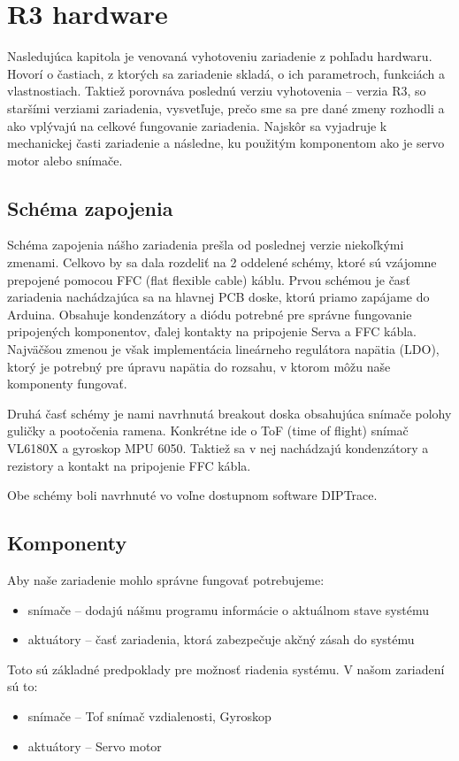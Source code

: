 \chapter{R3 hardware}
\label{kap:2}
Nasledujúca kapitola je venovaná vyhotoveniu zariadenie z pohľadu hardwaru. Hovorí o častiach, z ktorých sa zariadenie skladá, o ich parametroch, funkciách a vlastnostiach. Taktiež porovnáva poslednú verziu vyhotovenia – verzia R3, so staršími verziami zariadenia, vysvetľuje, prečo sme sa pre dané zmeny rozhodli a ako vplývajú na celkové fungovanie zariadenia. Najskôr sa vyjadruje k mechanickej časti zariadenie a následne, ku použitým komponentom ako je servo motor alebo snímače. 

\section{Schéma zapojenia}
\label{kap:2.1}

Schéma zapojenia nášho zariadenia prešla od poslednej verzie niekoľkými zmenami. Celkovo by sa dala rozdeliť na 2 oddelené schémy, ktoré sú vzájomne prepojené pomocou FFC (flat flexible cable) káblu. Prvou schémou je časť zariadenia nachádzajúca sa na hlavnej PCB doske, ktorú priamo zapájame do Arduina. Obsahuje kondenzátory a diódu potrebné pre správne fungovanie pripojených komponentov, ďalej kontakty na pripojenie Serva a FFC kábla. Najväčšou zmenou je však implementácia lineárneho regulátora napätia (LDO), ktorý je potrebný pre úpravu napätia do rozsahu, v ktorom môžu naše komponenty fungovať.

Druhá časť schémy je nami navrhnutá breakout doska obsahujúca snímače polohy guličky a pootočenia ramena. Konkrétne ide o ToF (time of flight) snímač VL6180X a gyroskop MPU 6050. Taktiež sa v nej nachádzajú kondenzátory a rezistory a kontakt na pripojenie FFC kábla.

Obe schémy boli navrhnuté vo voľne dostupnom software DIPTrace. 
 
 
 
\section{Komponenty}
\label{kap:2.2}

Aby naše zariadenie mohlo správne fungovať potrebujeme:
\begin{itemize}
	\item snímače – dodajú nášmu programu informácie o aktuálnom stave systému
	\item aktuátory – časť zariadenia, ktorá zabezpečuje akčný zásah do  systému
\end{itemize}
Toto sú základné predpoklady pre možnosť riadenia systému. V našom zariadení sú to:
\begin{itemize}
    \item snímače – Tof snímač vzdialenosti, Gyroskop
	\item aktuátory – Servo motor 
\end{itemize}


